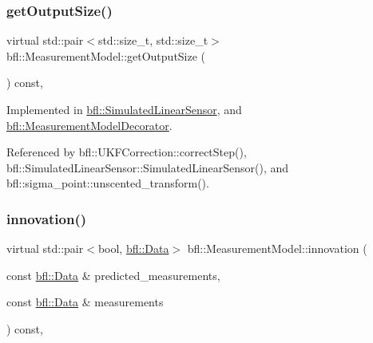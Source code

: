 \mbox{\label{classbfl_1_1MeasurementModel_a6cca2022b576c9dbb61e73b83a10c6ee}} 
\subsubsection{\texorpdfstring{get\+Output\+Size()}{getOutputSize()}}
{\footnotesize\ttfamily virtual std\+::pair$<$std\+::size\+\_\+t, std\+::size\+\_\+t$>$ bfl\+::\+Measurement\+Model\+::get\+Output\+Size (\begin{DoxyParamCaption}{ }\end{DoxyParamCaption}) const\hspace{0.3cm}{\ttfamily [pure virtual]}, {\ttfamily [inherited]}}



Implemented in \mbox{\hyperlink{classbfl_1_1SimulatedLinearSensor_a00e869da2b16b5ead1d76a7b32e9fc4b}{bfl\+::\+Simulated\+Linear\+Sensor}}, and \mbox{\hyperlink{classbfl_1_1MeasurementModelDecorator_a9522d1549c62f55a59401f6fa53421e8}{bfl\+::\+Measurement\+Model\+Decorator}}.



Referenced by bfl\+::\+U\+K\+F\+Correction\+::correct\+Step(), bfl\+::\+Simulated\+Linear\+Sensor\+::\+Simulated\+Linear\+Sensor(), and bfl\+::sigma\+\_\+point\+::unscented\+\_\+transform().

\mbox{\label{classbfl_1_1MeasurementModel_aa06e0643805551a981bcc013ad44c829}} 
\subsubsection{\texorpdfstring{innovation()}{innovation()}}
{\footnotesize\ttfamily virtual std\+::pair$<$bool, \mbox{\hyperlink{namespacebfl_af6b103c6821db1b54452f776fdd9dd02}{bfl\+::\+Data}}$>$ bfl\+::\+Measurement\+Model\+::innovation (\begin{DoxyParamCaption}\item[{const \mbox{\hyperlink{namespacebfl_af6b103c6821db1b54452f776fdd9dd02}{bfl\+::\+Data}} \&}]{predicted\+\_\+measurements,  }\item[{const \mbox{\hyperlink{namespacebfl_af6b103c6821db1b54452f776fdd9dd02}{bfl\+::\+Data}} \&}]{measurements }\end{DoxyParamCaption}) const\hspace{0.3cm}{\ttfamily [pure virtual]}, {\ttfamily [inherited]}}



